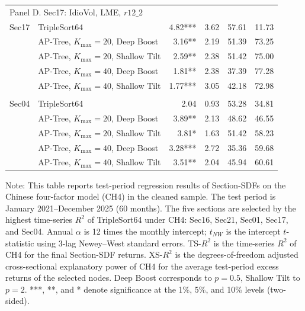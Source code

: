 \documentclass[12pt]{article}
\def\mathrm#1{#1}%
\def\textit#1{#1}%
\begin{document}
\begin{table}[!htbp]
\begin{threeparttable}
\begin{tabular}{llrrrr}
      \multicolumn{6}{l}{\textit{Panel D. Sec17: IdioVol, LME, $r12\_2$}} \\
      \quad Sec17
      & TripleSort64
      & 4.82*** & 3.62 & 57.61 & 11.73 \\
      & AP-Tree, $K_{\max}=20$, Deep Boost
      & 3.16** & 2.19 & 51.39 & 73.25 \\
      & AP-Tree, $K_{\max}=20$, Shallow Tilt
      & 2.59** & 2.38 & 51.42 & 75.00 \\
      & AP-Tree, $K_{\max}=40$, Deep Boost
      & 1.81** & 2.38 & 37.39 & 77.28 \\
      & AP-Tree, $K_{\max}=40$, Shallow Tilt
      & 1.77*** & 3.05 & 42.18 & 72.98 \\
      \addlinespace[1pt]

      \multicolumn{6}{l}{\textit{Panel E. Sec04: Lturnover, IdioVol, LME}} \\
      \quad Sec04
      & TripleSort64
      & 2.04 & 0.93 & 53.28 & 34.81 \\
      & AP-Tree, $K_{\max}=20$, Deep Boost
      & 3.89** & 2.13 & 48.62 & 46.55 \\
      & AP-Tree, $K_{\max}=20$, Shallow Tilt
      & 3.81* & 1.63 & 51.42 & 58.23 \\
      & AP-Tree, $K_{\max}=40$, Deep Boost
      & 3.28*** & 2.72 & 35.36 & 59.68 \\
      & AP-Tree, $K_{\max}=40$, Shallow Tilt
      & 3.51** & 2.04 & 45.94 & 60.61 \\
      \bottomrule
    \end{tabular}

    \begin{tablenotes}[flushleft]
      \footnotesize
      \item \textit{Note:} This table reports test-period regression results of Section-SDFs on the Chinese four-factor model (CH4) in the cleaned sample. The test period is January 2021–December 2025 (60 months). The five sections are selected by the highest time-series $R^2$ of TripleSort64 under CH4: Sec16, Sec21, Sec01, Sec17, and Sec04. Annual $\alpha$ is 12 times the monthly intercept; $t_{\mathrm{NW}}$ is the intercept $t$-statistic using 3-lag Newey--West standard errors. TS-$R^2$ is the time-series $R^2$ of CH4 for the final Section-SDF returns. XS-$R^2$ is the degrees-of-freedom adjusted cross-sectional explanatory power of CH4 for the average test-period excess returns of the selected nodes. Deep Boost corresponds to $p=0.5$, Shallow Tilt to $p=2$. ***, **, and * denote significance at the 1\%, 5\%, and 10\% levels (two-sided).
    \end{tablenotes}
  \end{threeparttable}
\end{table}
\end{document}
